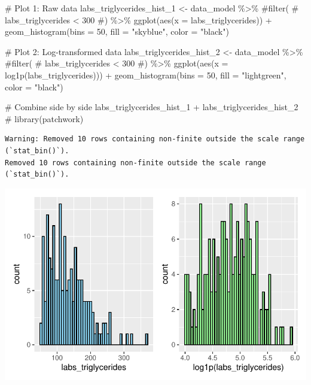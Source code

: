 \documentclass[
  letterpaper,
  DIV=11,
  numbers=noendperiod]{scrartcl}
\newenvironment{Shaded}{\begin{snugshade}}{\end{snugshade}}
\newcommand{\AttributeTok}[1]{\textcolor[rgb]{0.40,0.45,0.13}{#1}}
\newcommand{\CommentTok}[1]{\textcolor[rgb]{0.37,0.37,0.37}{#1}}
\newcommand{\DecValTok}[1]{\textcolor[rgb]{0.68,0.00,0.00}{#1}}
\newcommand{\FunctionTok}[1]{\textcolor[rgb]{0.28,0.35,0.67}{#1}}
\newcommand{\NormalTok}[1]{\textcolor[rgb]{0.00,0.23,0.31}{#1}}
\newcommand{\OtherTok}[1]{\textcolor[rgb]{0.00,0.23,0.31}{#1}}
\newcommand{\SpecialCharTok}[1]{\textcolor[rgb]{0.37,0.37,0.37}{#1}}
\newcommand{\StringTok}[1]{\textcolor[rgb]{0.13,0.47,0.30}{#1}}
\begin{document}
\begin{Shaded}
\begin{Highlighting}[]
\CommentTok{\# Plot 1: Raw data}
\NormalTok{labs\_triglycerides\_hist\_1 }\OtherTok{\textless{}{-}}\NormalTok{ data\_model }\SpecialCharTok{\%\textgreater{}\%} 
    \CommentTok{\#filter(}
    \CommentTok{\#    labs\_triglycerides \textless{} 300}
    \CommentTok{\#) \%\textgreater{}\% }
    \FunctionTok{ggplot}\NormalTok{(}\FunctionTok{aes}\NormalTok{(}\AttributeTok{x =}\NormalTok{ labs\_triglycerides)) }\SpecialCharTok{+} 
    \FunctionTok{geom\_histogram}\NormalTok{(}\AttributeTok{bins =} \DecValTok{50}\NormalTok{, }\AttributeTok{fill =} \StringTok{"skyblue"}\NormalTok{, }\AttributeTok{color =} \StringTok{"black"}\NormalTok{)}

\CommentTok{\# Plot 2: Log{-}transformed data}
\NormalTok{labs\_triglycerides\_hist\_2 }\OtherTok{\textless{}{-}}\NormalTok{ data\_model }\SpecialCharTok{\%\textgreater{}\%} 
    \CommentTok{\#filter(}
    \CommentTok{\#    labs\_triglycerides \textless{} 300}
    \CommentTok{\#) \%\textgreater{}\%}
    \FunctionTok{ggplot}\NormalTok{(}\FunctionTok{aes}\NormalTok{(}\AttributeTok{x =} \FunctionTok{log1p}\NormalTok{(labs\_triglycerides))) }\SpecialCharTok{+} 
    \FunctionTok{geom\_histogram}\NormalTok{(}\AttributeTok{bins =} \DecValTok{50}\NormalTok{, }\AttributeTok{fill =} \StringTok{"lightgreen"}\NormalTok{, }\AttributeTok{color =} \StringTok{"black"}\NormalTok{)}

\CommentTok{\# Combine side by side}
\NormalTok{labs\_triglycerides\_hist\_1 }\SpecialCharTok{+}\NormalTok{ labs\_triglycerides\_hist\_2 }\CommentTok{\# library(patchwork)}
\end{Highlighting}
\end{Shaded}

\begin{verbatim}
Warning: Removed 10 rows containing non-finite outside the scale range (`stat_bin()`).
Removed 10 rows containing non-finite outside the scale range (`stat_bin()`).
\end{verbatim}

\includegraphics{Outcomes_V1V2V3_files/figure-pdf/labs_triglycerides_1-1.pdf}
\end{document}
